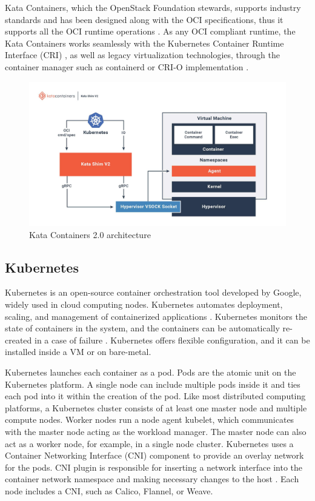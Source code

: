 Kata Containers, which the OpenStack Foundation stewards, supports industry standards and has been designed along with the OCI \cite{OCI} specifications, thus it supports all the OCI runtime operations \cite{Kumar2020}. As any OCI compliant runtime, the Kata Containers works seamlessly with the Kubernetes Container Runtime Interface (CRI) \cite{CRI}, as well as legacy virtualization technologies, through the container manager such as containerd or CRI-O implementation \cite{Randazzo2019}.

\begin{figure}[ht]
  \begin{center}
    \includegraphics[width=13.5cm]{images/KataContainersArchitecture.jpg}
    \caption{Kata Containers 2.0 architecture \cite{KataContainers}}
    \label{fig:KataContainersArchitecture}
  \end{center}
\end{figure}

\subsection{Kubernetes}

Kubernetes is an open-source container orchestration tool developed by Google, widely used in cloud computing nodes. Kubernetes automates deployment, scaling, and management of containerized applications \cite{Kubernetes}. Kubernetes monitors the state of containers in the system, and the containers can be automatically re-created in a case of failure \cite{Toimela2017}. Kubernetes offers flexible configuration, and it can be installed inside a VM or on bare-metal. 

Kubernetes launches each container as a pod. Pods are the atomic unit on the Kubernetes platform. A single node can include multiple pods inside it and ties each pod into it within the creation of the pod. Like most distributed computing platforms, a Kubernetes cluster consists of at least one master node and multiple compute nodes. Worker nodes run a node agent kubelet, which communicates with the master node acting as the workload manager. The master node can also act as a worker node, for example, in a single node cluster. Kubernetes uses a Container Networking Interface (CNI)\cite{CNI} component to provide an overlay network for the pods. CNI plugin is responsible for inserting a network interface into the container network namespace and making necessary changes to the host \cite{RedHatCNI}. Each node includes a CNI, such as Calico, Flannel, or Weave.

